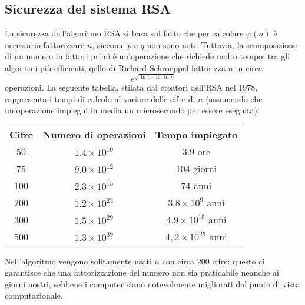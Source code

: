 \documentclass[italian,A4,12pt]{article}
\begin{document}
      \subsection{Sicurezza del sistema RSA}
      La sicurezza dell'algoritmo RSA si basa sul fatto che per calcolare $\varphi(n)$ è necessario fattorizzare $n$, siccome $p$ e $q$ non sono noti.
      Tuttavia, la scomposizione di un numero in fattori primi è un'operazione che richiede molto tempo: tra gli algoritmi più efficienti, qello di Richard Schroeppel fattorizza $n$ in circa $$e^{\sqrt{\ln{n}\cdot\ln{\ln{n}}}}$$
      operazioni. La seguente tabella, stilata dai creatori dell'RSA nel 1978, rappresenta i tempi di calcolo al variare delle cifre di $n$ (assumendo che un'operazione impieghi in media un microsecondo per essere eseguita):
      ~\\
      \begin{center}
        \begin{tabular}{c c c}
          \textbf{Cifre}&\textbf{Numero di operazioni}&\textbf{Tempo impiegato}\\
          50&$1.4\times 10^{10}$&3.9 ore\\
          75&$9.0\times 10^{12}$&104 giorni\\
          100&$2.3\times 10^{15}$&74 anni\\
          200&$1.2\times 10^{23}$&$3.8\times 10^9$ anni\\
          300&$1.5\times 10^{29}$&$4.9\times 10^{15}$ anni\\
          500&$1.3\times 10^{39}$&$4,2\times 10^{25}$ anni\\

        \end{tabular}
      \end{center}
      Nell'algoritmo vengono solitamente usati $n$ con circa 200 cifre: questo ci garantisce che una fattorizzazione del numero non sia praticabile neanche ai giorni nostri, sebbene i computer siano notevolmente migliorati dal punto di vista computazionale.

      \newpage
\end{document}
